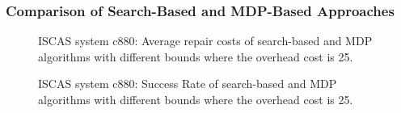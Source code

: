 \documentclass[review]{elsarticle}
\newcommand\meir[1]{\textcolor{red}{meir: #1}}
\begin{document}
\subsubsection{Comparison of Search-Based and MDP-Based Approaches}


\begin{figure}{}
\caption{%
ISCAS system c880: Average repair costs of search-based and MDP algorithms with different bounds where the overhead cost is 25.
}
\label{fig:I-search-MDP}
\end{figure}


\begin{figure}{}
  \caption{%
ISCAS system c880: Success Rate of search-based and MDP algorithms with different bounds where the overhead cost is 25.
}
  \label{fig:I-success-rate}
\end{figure}
\end{document}
